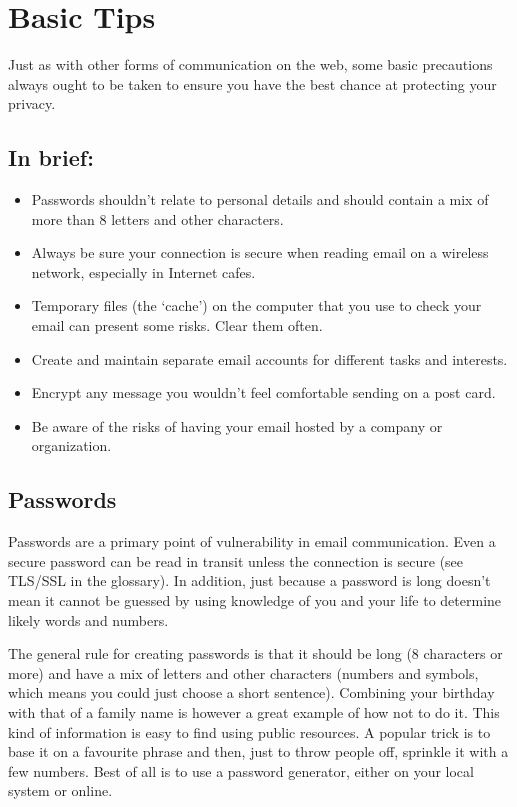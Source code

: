 \section{Basic Tips}

Just as with other forms of communication on the web, some basic
precautions always ought to be taken to ensure you have the best chance
at protecting your privacy.

\subsection{In brief:}

\begin{itemize}
\item
  Passwords shouldn't relate to personal details and should contain a
  mix of more than 8 letters and other characters.
\item
  Always be sure your connection is secure when reading email on a
  wireless network, especially in Internet cafes.
\item
  Temporary files (the `cache') on the computer that you use to check
  your email can present some risks. Clear them often.
\item
  Create and maintain separate email accounts for different tasks and
  interests.
\item
  Encrypt any message you wouldn't feel comfortable sending on a post
  card.
\item
  Be aware of the risks of having your email hosted by a company or
  organization.
\end{itemize}
\subsection{Passwords}

Passwords are a primary point of vulnerability in email communication.
Even a secure password can be read in transit unless the connection is
secure (see TLS/SSL in the glossary). In addition, just because a
password is long doesn't mean it cannot be guessed by using knowledge of
you and your life to determine likely words and numbers.

The general rule for creating passwords is that it should be long (8
characters or more) and have a mix of letters and other characters
(numbers and symbols, which means you could just choose a short
sentence). Combining your birthday with that of a family name is however
a great example of how not to do it. This kind of information is easy to
find using public resources. A popular trick is to base it on a
favourite phrase and then, just to throw people off, sprinkle it with a
few numbers. Best of all is to use a password generator, either on your
local system or online.

